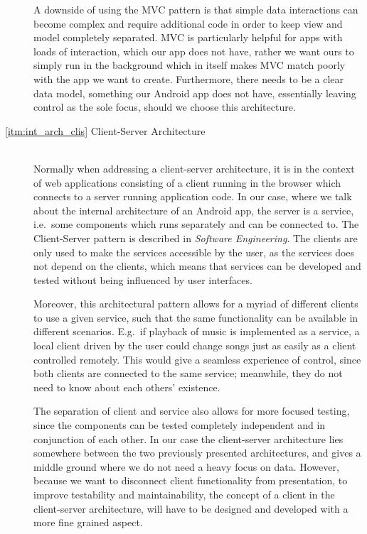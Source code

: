 \begin{description}
A downside of using the MVC pattern is that simple data interactions can become complex and require additional code in order to keep view and model completely separated.
MVC is particularly helpful for apps with loads of interaction, which our app does not have, rather we want ours to simply run in the background which in itself makes MVC match poorly with the app we want to create.
Furthermore, there needs to be a clear data model, something our Android app does not have, essentially leaving control as the sole focus, should we choose this architecture.

\item[\ref{itm:int_arch_clis} Client-Server Architecture]\hfill\\
Normally when addressing a client-server architecture, it is in the context of web applications consisting of a client running in the browser which connects to a server running application code.
In our case, where we talk about the internal architecture of an Android app, the server is a service, i.e.~some components which runs separately and can be connected to.
The Client-Server pattern is described in \textit{Software Engineering}\cite[p.~180-181]{sommerville}.
The clients are only used to make the services accessible by the user, as the services does not depend on the clients, which means that services can be developed and tested without being influenced by user interfaces.

Moreover, this architectural pattern allows for a myriad of different clients to use a given service, such that the same functionality can be available in different scenarios.
E.g.~if playback of music is implemented as a service, a local client driven by the user could change songs just as easily as a client controlled remotely.
This would give a seamless experience of control, since both clients are connected to the same service; meanwhile, they do not need to know about each others' existence.

The separation of client and service also allows for more focused testing, since the components can be tested completely independent and in conjunction of each other.
In our case the client-server architecture lies somewhere between the two previously presented architectures, and gives a middle ground where we do not need a heavy focus on data.
However, because we want to disconnect client functionality from presentation, to improve testability and maintainability, the concept of a client in the client-server architecture, will have to be designed and developed with a more fine grained aspect.
\end{description}
